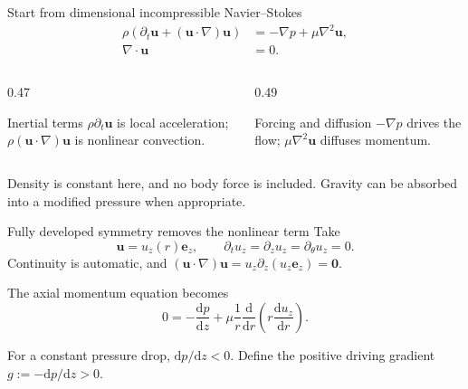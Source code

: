 \documentclass[aspectratio=169,11pt]{beamer}
\newcommand{\uu}{\bm{u}}
\begin{document}
\begin{frame}{Start from dimensional incompressible Navier--Stokes}
\begin{align*}
  \rho\left(\partial_t\uu+(\uu\cdot\nabla)\uu\right)
  &= -\nabla p+\mu\nabla^2\uu,\\
  \nabla\cdot\uu&=0.
\end{align*}

\begin{columns}[T,onlytextwidth]
\begin{column}{0.47\textwidth}
\begin{block}{Inertial terms}
$\rho\partial_t\uu$ is local acceleration; $\rho(\uu\cdot\nabla)\uu$ is nonlinear convection.
\end{block}
\end{column}
\begin{column}{0.49\textwidth}
\begin{block}{Forcing and diffusion}
$-\nabla p$ drives the flow; $\mu\nabla^2\uu$ diffuses momentum.
\end{block}
\end{column}
\end{columns}
\vspace{0.5em}

Density is constant here, and no body force is included. Gravity can be absorbed into a modified pressure when appropriate.
\end{frame}

\begin{frame}{Fully developed symmetry removes the nonlinear term}
Take
\[
  \uu=u_z(r)\bm e_z,
  \qquad
  \partial_tu_z=\partial_zu_z=\partial_\theta u_z=0.
\]
Continuity is automatic, and $(\uu\cdot\nabla)\uu=u_z\partial_z(u_z\bm e_z)=\bm0$.

The axial momentum equation becomes
\[
  0=-\frac{\mathrm dp}{\mathrm dz}
    +\mu\frac1r\frac{\mathrm d}{\mathrm dr}
      \left(r\frac{\mathrm du_z}{\mathrm dr}\right).
\]

\begin{punchbox}
For a constant pressure drop, $\mathrm dp/\mathrm dz<0$. Define the positive driving gradient $g:=-\mathrm dp/\mathrm dz>0$.
\end{punchbox}
\end{frame}
\end{document}

